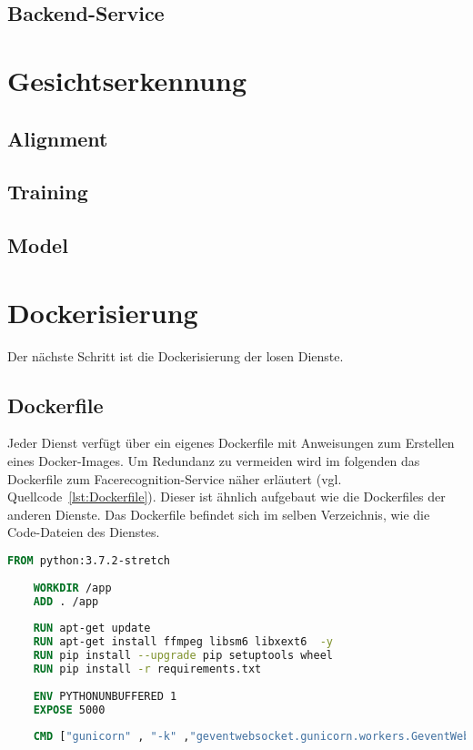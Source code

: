 \subsection{Backend-Service}


\section{Gesichtserkennung}
\subsection{Alignment}
\subsection{Training}
\subsection{Model}

\section{Dockerisierung}

Der nächste Schritt ist die Dockerisierung der losen Dienste.

\subsection{Dockerfile}

Jeder Dienst verfügt über ein eigenes Dockerfile mit Anweisungen zum Erstellen eines Docker-Images.
Um Redundanz zu vermeiden wird im folgenden das Dockerfile zum Facerecognition-Service näher erläutert (vgl. Quellcode~\ref{lst:Dockerfile}).
Dieser ist ähnlich aufgebaut wie die Dockerfiles der anderen Dienste.
Das Dockerfile befindet sich im selben Verzeichnis, wie die Code-Dateien des Dienstes.


\begin{lstlisting}[caption={Dockerfile},captionpos=b ,label={lst:Dockerfile},language=Dockerfile]
    FROM python:3.7.2-stretch
    
    WORKDIR /app
    ADD . /app
    
    RUN apt-get update
    RUN apt-get install ffmpeg libsm6 libxext6  -y
    RUN pip install --upgrade pip setuptools wheel
    RUN pip install -r requirements.txt
    
    ENV PYTHONUNBUFFERED 1
    EXPOSE 5000
    
    CMD ["gunicorn" , "-k" ,"geventwebsocket.gunicorn.workers.GeventWebSocketWorker", "-w", "3" , "--bind" , ":5000" , "run:app"]
    \end{lstlisting}

